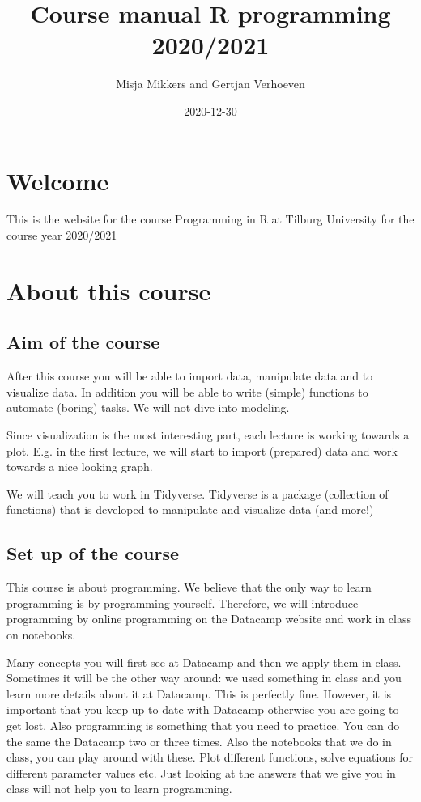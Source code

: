 \documentclass[
]{book}
\title{Course manual R programming 2020/2021}
\author{Misja Mikkers and Gertjan Verhoeven}
\date{2020-12-30}
\begin{document}
\maketitle

{
\setcounter{tocdepth}{1}
\tableofcontents
}
\hypertarget{welcome}{%
\chapter*{Welcome}\label{welcome}}

This is the website for the course Programming in R at Tilburg University for the course year 2020/2021

\hypertarget{about-this-course}{%
\chapter{About this course}\label{about-this-course}}

\hypertarget{aim-of-the-course}{%
\section{Aim of the course}\label{aim-of-the-course}}

After this course you will be able to import data, manipulate data and to visualize data. In addition you will be able to write (simple) functions to automate (boring) tasks. We will not dive into modeling.

Since visualization is the most interesting part, each lecture is working towards a plot. E.g. in the first lecture, we will start to import (prepared) data and work towards a nice looking graph.

We will teach you to work in Tidyverse. Tidyverse is a package (collection of functions) that is developed to manipulate and visualize data (and more!)

\hypertarget{set-up-of-the-course}{%
\section{Set up of the course}\label{set-up-of-the-course}}

This course is about programming. We believe that the only way to learn programming is by programming yourself. Therefore, we will introduce programming by online programming on the Datacamp website and work in class on notebooks.

Many concepts you will first see at Datacamp and then we apply them in class. Sometimes it will be the other way around: we used something in class and you learn more details about it at Datacamp. This is perfectly fine. However, it is important that you keep up-to-date with Datacamp otherwise you are going to get lost. Also programming is something that you need to practice. You can do the same the Datacamp two or three times. Also the notebooks that we do in class, you can play around with these. Plot different functions, solve equations for different parameter values etc. Just looking at the answers that we give you in class will not help you to learn programming.
\end{document}
